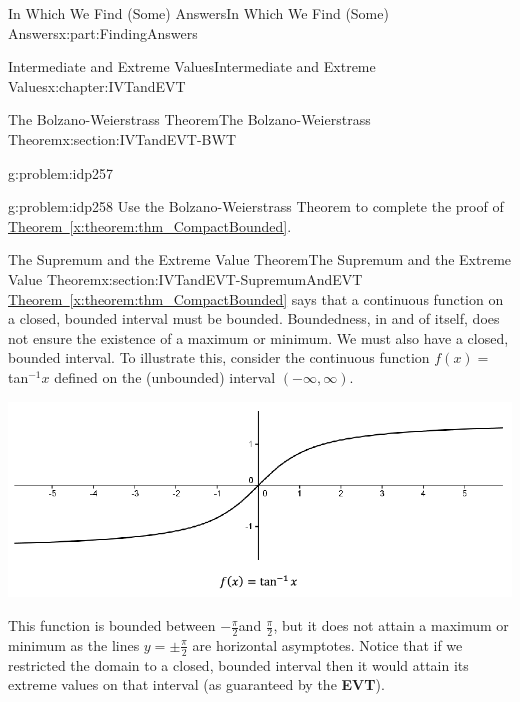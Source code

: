 \documentclass[oneside,10pt,]{book}
\newcommand{\xreffont}{\relax}
\newcommand{\terminology}[1]{\textbf{#1}}
\numberwithin{equation}{section}
\begin{document}
\begin{partptx}{In Which We Find (Some) Answers}{}{In Which We Find (Some) Answers}{}{}{x:part:FindingAnswers}
\begin{chapterptx}{Intermediate and Extreme Values}{}{Intermediate and Extreme Values}{}{}{x:chapter:IVTandEVT}
\begin{sectionptx}{The Bolzano-Weierstrass Theorem}{}{The Bolzano-Weierstrass Theorem}{}{}{x:section:IVTandEVT-BWT}
\begin{problem}{}{g:problem:idp257}
\end{problem}
\begin{problem}{}{g:problem:idp258}%
 Use the Bolzano-Weierstrass Theorem to complete the proof of \hyperref[x:theorem:thm_CompactBounded]{Theorem~{\xreffont\ref{x:theorem:thm_CompactBounded}}}.%
\end{problem}
\end{sectionptx}
%
%
\typeout{************************************************}
\typeout{************************************************}
%
\begin{sectionptx}{The Supremum and the Extreme Value Theorem}{}{The Supremum and the Extreme Value Theorem}{}{}{x:section:IVTandEVT-SupremumAndEVT}
\hyperref[x:theorem:thm_CompactBounded]{Theorem~{\xreffont\ref{x:theorem:thm_CompactBounded}}} says that a continuous function on a closed, bounded interval must be bounded. Boundedness, in and of itself, does not ensure the existence of a maximum or minimum. We must also have a closed, bounded interval. To illustrate this, consider the continuous function \(f(x)=\)tan\(^{-1}x\) defined on the (unbounded) interval \(\left(-\infty,\infty\right)\).%
\begin{image}{0.125}{0.75}{0.125}%
\includegraphics[width=\linewidth]{images/Ch6fig8.png}
\end{image}%
This function is bounded between \(-\frac{\pi}{2}\)and \(\frac{\pi}{2}\), but it does not attain a maximum or minimum as the lines \(y=\pm\frac{\pi}{2}\) are horizontal asymptotes. Notice that if we restricted the domain to a closed, bounded interval then it would attain its extreme values on that interval (as guaranteed by the \terminology{EVT}).%
\par

\end{sectionptx}
\end{chapterptx}
\end{partptx}
\end{document}
